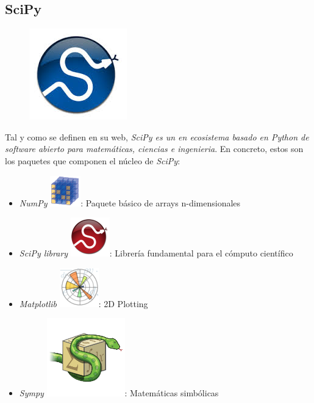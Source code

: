 \documentclass[10pt,a4paper]{report}
\begin{document}
\subsection{SciPy\cite{SciPy2014}}
\begin{figure}[!h]{}
    \centering
    \includegraphics[scale=0.3]{img/logoSciPy.jpg}
\end{figure}
Tal y como se definen en su web, \textit{SciPy es un en ecosistema basado en Python de software abierto para matemáticas, ciencias e ingenieria}. En concreto, estos son los paquetes que componen el núcleo de \textit{SciPy}:
\begin{itemize}
	\item \textit{NumPy} \includegraphics[scale=0.4]{img/numpylogo_med.png}: Paquete básico de arrays n-dimensionales
	\item \textit{SciPy library} \includegraphics[scale=0.4]{img/scipy_med.png}: Librería fundamental para el cómputo científico
	\item \textit{Matplotlib} \includegraphics[scale=0.4]{img/matplotlib_med.png}: 2D Plotting
	\item \textit{Sympy} \includegraphics[scale=0.2]{img/sympy_logo.png}: Matemáticas simbólicas	
\end{itemize}
\end{document}
